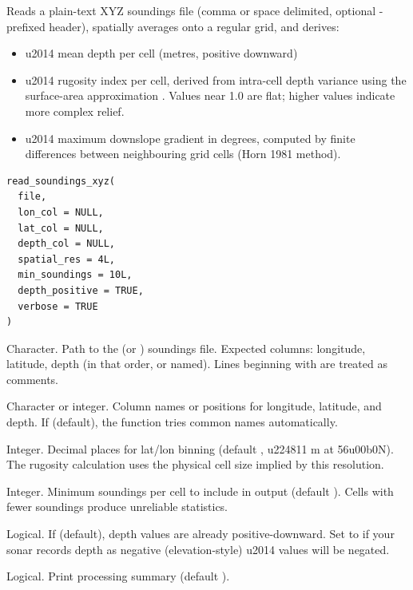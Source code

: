 \documentclass[a4paper]{book}
\begin{document}
\begin{Description}
Reads a plain-text XYZ soundings file (comma or space delimited, optional
\AsIs{\texttt{\#}}-prefixed header), spatially averages onto a regular grid, and derives:
\begin{itemize}

\item{}  \bsl{}u2014 mean depth per cell (metres, positive downward)
\item{}  \bsl{}u2014 rugosity index per cell, derived from intra-cell depth
variance using the surface-area approximation
. Values near 1.0 are
flat; higher values indicate more complex relief.
\item{}  \bsl{}u2014 maximum downslope gradient in degrees, computed by finite
differences between neighbouring grid cells (Horn 1981 method).

\end{itemize}

\end{Description}
%
\begin{Usage}
\begin{verbatim}
read_soundings_xyz(
  file,
  lon_col = NULL,
  lat_col = NULL,
  depth_col = NULL,
  spatial_res = 4L,
  min_soundings = 10L,
  depth_positive = TRUE,
  verbose = TRUE
)
\end{verbatim}
\end{Usage}
%
\begin{Arguments}
\begin{ldescription}
\item[\code{file}] Character. Path to the  (or ) soundings file.
Expected columns: longitude, latitude, depth (in that order, or named).
Lines beginning with \AsIs{\texttt{\#}} are treated as comments.

\item[\code{lon\_col}, \code{lat\_col}, \code{depth\_col}] Character or integer. Column names or
positions for longitude, latitude, and depth. If  (default), the
function tries common names automatically.

\item[\code{spatial\_res}] Integer. Decimal places for lat/lon binning (default ,
\bsl{}u224811 m at 56\bsl{}u00b0N). The rugosity calculation uses the physical cell size
implied by this resolution.

\item[\code{min\_soundings}] Integer. Minimum soundings per cell to include in output
(default ). Cells with fewer soundings produce unreliable statistics.

\item[\code{depth\_positive}] Logical. If  (default), depth values are already
positive-downward. Set to  if your sonar records depth as negative
(elevation-style) \bsl{}u2014 values will be negated.

\item[\code{verbose}] Logical. Print processing summary (default ).
\end{ldescription}
\end{Arguments}
\end{document}
